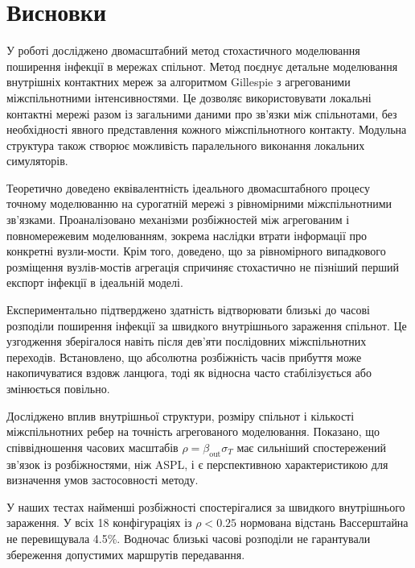 \section{Висновки}
\label{sec:conclusions}

У роботі досліджено
двомасштабний метод
стохастичного моделювання
поширення інфекції
в мережах спільнот.
Метод поєднує детальне
моделювання внутрішніх
контактних мереж
за алгоритмом Gillespie
з агрегованими
міжспільнотними
інтенсивностями.
Це дозволяє використовувати
локальні контактні мережі
разом із загальними
даними про зв'язки
між спільнотами,
без необхідності
явного представлення
кожного міжспільнотного
контакту. Модульна
структура також
створює можливість
паралельного виконання
локальних симуляторів.

Теоретично доведено
еквівалентність ідеального
двомасштабного процесу
точному моделюванню
на сурогатній мережі
з рівномірними
міжспільнотними
зв'язками. Проаналізовано
механізми розбіжностей
між агрегованим
і повномережевим
моделюванням,
зокрема наслідки
втрати інформації
про конкретні
вузли-мости. Крім того, доведено, що за
рівномірного випадкового розміщення
вузлів-мостів агрегація спричиняє
стохастично не пізніший перший
експорт інфекції в ідеальній моделі.

Експериментально
підтверджено здатність
\TS{} відтворювати
близькі до \Full{}
часові розподіли
поширення інфекції
за швидкого внутрішнього
зараження спільнот.
Це узгодження
зберігалося навіть
після дев'яти
послідовних
міжспільнотних
переходів.
Встановлено, що
абсолютна розбіжність
часів прибуття
може накопичуватися
вздовж ланцюга,
тоді як відносна
часто стабілізується
або змінюється
повільно.

Досліджено вплив
внутрішньої структури,
розміру спільнот
і кількості
міжспільнотних
ребер на точність
агрегованого
моделювання.
Показано, що
співвідношення
часових масштабів
$\rho=\beta_{\mathrm{out}}\sigma_T$
має сильніший
спостережений зв'язок
із розбіжностями,
ніж ASPL, і є
перспективною
характеристикою
для визначення
умов застосовності
методу.

У наших тестах найменші розбіжності спостерігалися
за швидкого внутрішнього зараження. У всіх 18
конфігураціях із $\rho<0.25$ нормована відстань
Вассерштайна не перевищувала 4.5\%.
Водночас близькі часові розподіли не гарантували
збереження допустимих маршрутів передавання.






\clearpage

